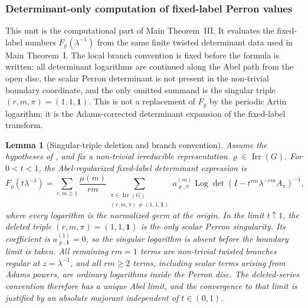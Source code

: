 \documentclass[11pt,a4paper]{amsart}
\theoremstyle{plain}
\newtheorem{lemma}[theorem]{Lemma}
\theoremstyle{definition}
\theoremstyle{remark}
\DeclareMathOperator{\Irr}{Irr}
\DeclareMathOperator{\Log}{Log}
\begin{document}
\subsubsection{Determinant-only computation of fixed-label Perron values}
\label{subsubsec:determinant-only-fixed-label-values}

This unit is the computational part of Main Theorem~III.  It evaluates the
fixed-label numbers \(F_\varrho(\lambda^{-1})\) from the same finite twisted
determinant data used in Main Theorem~I.  The local branch convention is fixed
before the formula is written: all determinant logarithms are continued along
the Abel path from the open disc, the scalar Perron determinant is not present
in the non-trivial boundary coordinate, and the only omitted summand is the
singular triple \((r,m,\pi)=(1,1,\mathbf1)\).  This is not a replacement of
\(F_\varrho\) by the periodic Artin logarithm; it is the Adams-corrected
determinant expansion of the fixed-label transform.

\begin{lemma}[Singular-triple deletion and branch convention]
  \label{lem:fixed-label-singular-triple-deletion}
  Assume the hypotheses of , and fix a
  non-trivial irreducible representation \(\varrho\in\Irr(G)\).  For
  \(0<t<1\), the Abel-regularized fixed-label determinant expression is
  \begin{equation}\label{eq:fixed-label-singular-deletion-abel}
    F_\varrho(t\lambda^{-1})
    =
    \sum_{r,m\ge1}\frac{\mu(m)}{rm}
      \sum_{\substack{\pi\in\Irr(G)\\(r,m,\pi)\neq(1,1,\mathbf1)}}
        a_{\varrho,\pi}^{(m)}
        \Log\det(I-t^{rm}\lambda^{-rm}A_\pi)^{-1},
  \end{equation}
  where every logarithm is the normalized germ at the origin.  In the limit
  \(t\uparrow1\), the deleted triple \((r,m,\pi)=(1,1,\mathbf1)\) is the
  only scalar Perron singularity. Its coefficient is
  \(a_{\varrho,\mathbf1}^{(1)}=0\), so the singular logarithm is absent
  before the boundary limit is taken.  All remaining \(rm=1\) terms are
  non-trivial twisted branches regular at \(z=\lambda^{-1}\), and all
  \(rm\ge2\) terms, including scalar terms arising from Adams powers, are
  ordinary logarithms inside the Perron disc.  The deleted-series convention
  therefore has a unique Abel limit, and the convergence to that limit is
  justified by an absolute majorant independent of \(t\in(0,1)\).
\end{lemma}
\end{document}
